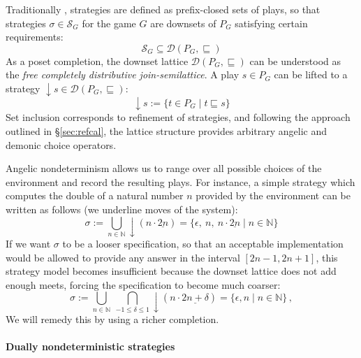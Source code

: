 \documentclass[sigplan,screen]{acmart}
\begin{document}
Traditionally \cite{gamesem99},
strategies are defined as
prefix-closed sets of plays,
so that strategies $\sigma \in \mathcal{S}_G$
for the game $G$ are downsets of $P_G$
satisfying certain requirements:
\[
    \mathcal{S}_G \subseteq
    \mathcal{D}(P_G, {\sqsubseteq})
\]
%
As a poset completion,
the downset lattice
$\mathcal{D}(P_G, {\sqsubseteq})$
can be understood as
the \emph{free completely distributive join-semilattice}.
A play $s \in P_G$ can be lifted to a strategy
${\downarrow} s \in \mathcal{D}(P_G, {\sqsubseteq})$:
\[
    {\downarrow} s := \{ t \in P_G \mid t \sqsubseteq s \}
\]
Set inclusion corresponds to refinement of strategies,
and following the approach outlined in \S\ref{sec:refcal},
the lattice structure provides
arbitrary angelic and demonic choice operators.

Angelic nondeterminism
allows us to range over all possible choices of the environment
and record the resulting plays.
For instance,
a simple strategy which computes
the double of a natural number $n$
provided by the environment
can be written as follows
(we underline moves of the system):
\[
  \sigma :=
    \bigcup_{n \in \mathbb{N}} {\downarrow}(n \cdot \underline{2n}) =
    \{ \epsilon, \: n, \: n \cdot \underline{2n} \mid n \in \mathbb{N} \}
\]
If we want $\sigma$ to be a looser specification,
so that an acceptable implementation
would be allowed to provide any answer in the interval
$[2n - 1, 2n + 1]$,
this strategy model becomes insufficient
because the downset lattice does not add enough meets,
forcing the specification to become
much coarser:
\[
  \sigma :=
    \bigcup_{n \in \mathbb{N}} \:
    \bigcap_{-1 \le \delta \le 1}
    {\downarrow}(n \cdot \underline{2n+\delta}) =
    \{ \epsilon, n \mid n \in \mathbb{N} \} \,,
\]
We will remedy this by using a richer completion.


\paragraph{Dually nondeterministic strategies} %
\end{document}

